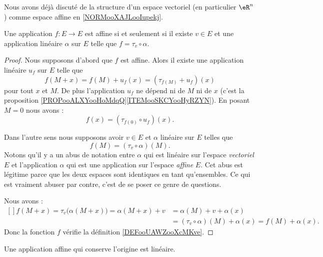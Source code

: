 Nous avons déjà discuté de la structure d'un espace vectoriel (en particulier \( \eR^n\)) comme espace affine en \ref{NORMooXAJLooIupekj}.


\begin{lemma}\label{LEMooZZAIooOMiayy}
    Une application \( f\colon E\to E\) est affine si et seulement si il existe \( v\in E\) et une application linéaire \( \alpha\) sur \( E\) telle que \( f=\tau_v\circ\alpha\).
\end{lemma}

\begin{proof}
    Nous supposons d'abord que \( f\) est affine. Alors il existe une application linéaire \( u_f\) sur \( E\) telle que
    \begin{equation}
        f(M+x)=f(M)+u_f(x)=(\tau_{f(M)}+u_f)(x)
    \end{equation}
    pour tout \( x\) et \( M\). De plus l'application \( u_f\) ne dépend ni de \( M\) ni de \( x\) (c'est la proposition \ref{PROPooALXYooHoMdqQ}\ref{ITEMooSKCYooHyRZYN}). En posant \( M=0\) nous avons :
    \begin{equation}
        f(x)=(\tau_{f(0)}\circ u_f)(x).
    \end{equation}

    Dans l'autre sens nous supposons avoir \( v\in E\) et \( \alpha\) linéaire sur \( E\) telles que
    \begin{equation}
        f(M)=(\tau_v\circ\alpha)(M).
    \end{equation}
    Notons qu'il y a un abus de notation entre \( \alpha\) qui est linéaire sur l'espace \emph{vectoriel} \( E\) et l'application \( \alpha\) qui est une application sur l'espace \emph{affine} \( E\). Cet abus est légitime parce que les deux espaces sont identiques en tant qu'ensembles. Ce qui est vraiment abuser par contre, c'est de se poser ce genre de questions.

    Nous avons :
    \begin{equation}
        \begin{aligned}[]
            f(M+x)=\tau_v\big( \alpha(M+x) \big)=\alpha(M+x)+v&=\alpha(M)+v+\alpha(x)
            \\&=(\tau_v\circ\alpha)(M)+\alpha(x)=f(M)+\alpha(x).
        \end{aligned}
    \end{equation}
    Donc la fonction \( f\) vérifie la définition \ref{DEFooUAWZooXcMKve}.
\end{proof}

\begin{corollary}       \label{CORooATCNooUwEPNI}
    Une application affine qui conserve l'origine est linéaire.
\end{corollary}

